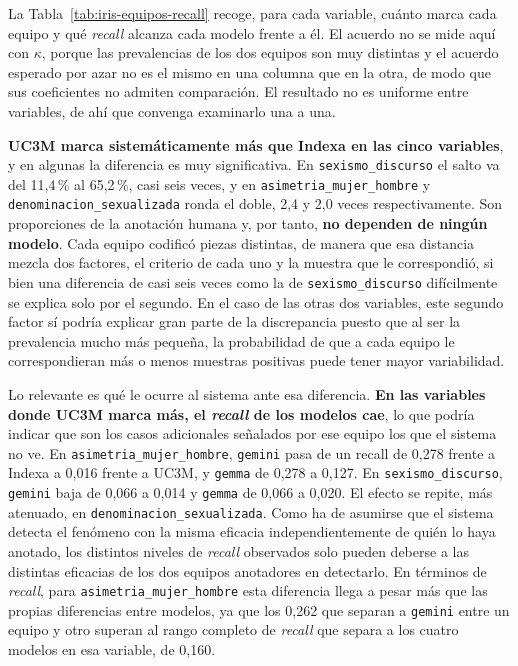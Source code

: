 La Tabla~\ref{tab:iris-equipos-recall} recoge, para cada variable, cuánto marca cada
equipo y qué \textit{recall} alcanza cada modelo frente a él. El acuerdo no se mide aquí con
$\kappa$, porque las prevalencias de los dos equipos son muy distintas y el acuerdo
esperado por azar no es el mismo en una columna que en la otra, de modo que sus
coeficientes no admiten comparación. El resultado no es uniforme entre variables, de
ahí que convenga examinarlo una a una.

\textbf{UC3M marca sistemáticamente más que Indexa en las cinco variables}, y en
algunas la diferencia es muy significativa. En \texttt{sexismo\_discurso} el salto va del
11,4\,\% al 65,2\,\%, casi seis veces, y en \texttt{asimetria\_mujer\_hombre} y
\texttt{denominacion\_sexualizada} ronda el doble, 2,4 y 2,0 veces respectivamente.
Son proporciones de la anotación humana y, por tanto, \textbf{no dependen de ningún
modelo}. Cada equipo codificó piezas distintas, de manera que esa distancia mezcla
dos factores, el criterio de cada uno y la muestra que le correspondió, si bien una
diferencia de casi seis veces como la de \texttt{sexismo\_discurso} difícilmente se
explica solo por el segundo. En el caso de las otras dos variables, este segundo factor sí podría explicar gran parte de la discrepancia puesto que al ser la prevalencia mucho más pequeña, la probabilidad de que a cada equipo le correspondieran más o menos muestras positivas puede tener mayor variabilidad.

Lo relevante es qué le ocurre al sistema ante esa diferencia. \textbf{En las variables donde
UC3M marca más, el \textit{recall} de los modelos cae}, lo que podría indicar que son los casos
adicionales señalados por ese equipo los que el sistema no ve. En
\texttt{asimetria\_mujer\_hombre}, \texttt{gemini} pasa de un recall de 0,278 frente
a Indexa a 0,016 frente a UC3M, y \texttt{gemma} de 0,278 a 0,127. En
\texttt{sexismo\_discurso}, \texttt{gemini} baja de 0,066 a 0,014 y \texttt{gemma} de
0,066 a 0,020. El efecto se repite, más atenuado, en
\texttt{denominacion\_sexualizada}. Como ha de asumirse que el sistema detecta el
fenómeno con la misma eficacia independientemente de quién lo haya anotado, los
distintos niveles de \textit{recall} observados solo pueden deberse a las distintas
eficacias de los dos equipos anotadores en detectarlo. En términos de \textit{recall},
para \texttt{asimetria\_mujer\_hombre} esta diferencia llega a pesar más que las
propias diferencias entre modelos, ya que los 0,262 que separan a \texttt{gemini}
entre un equipo y otro superan al rango completo de \textit{recall} que separa a los cuatro
modelos en esa variable, de 0,160.

